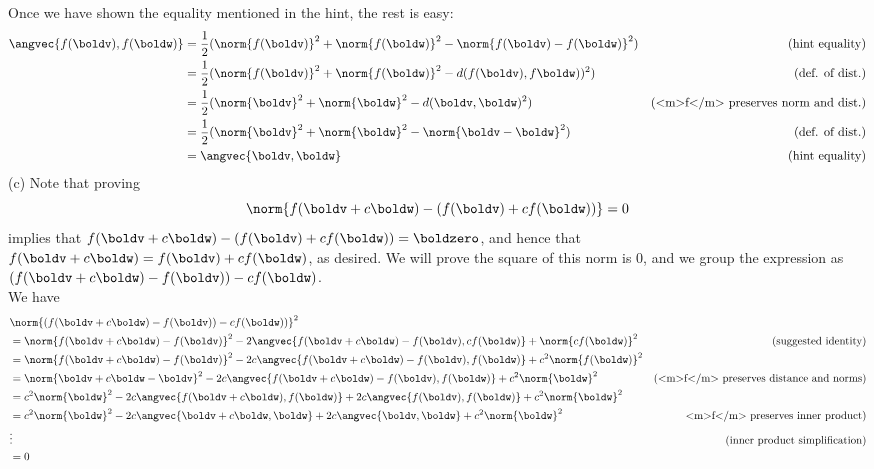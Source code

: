 \begin{solution}
Once we have shown the equality mentioned in the hint, the rest is easy:
\begin{align*}
\angvec{f(\boldv),f(\boldw)}&=\frac{1}{2}(\norm{f(\boldv)}^2+\norm{f(\boldw)}^2-\norm{f(\boldv)-f(\boldw)}^2) &\text{(hint equality)}\\
&=\frac{1}{2}(\norm{f(\boldv)}^2+\norm{f(\boldw)}^2-d(f(\boldv), f\boldw))^2) &\text{(def. of dist.)}\\
&=\frac{1}{2}(\norm{\boldv}^2+\norm{\boldw}^2-d(\boldv, \boldw)^2) &\text{(<m>f</m> preserves norm and dist.)}\\
&=\frac{1}{2}(\norm{\boldv}^2+\norm{\boldw}^2-\norm{\boldv-\boldw}^2) &\text{(def. of dist.)}\\
&=\angvec{\boldv,\boldw} &\text{(hint equality)}
\end{align*}
(c) Note that proving 
\[
\norm{f(\boldv+c\boldw)-(f(\boldv)+cf(\boldw))}=0
\]
implies that $f(\boldv+c\boldw)-(f(\boldv)+cf(\boldw))=\boldzero$, and hence that $f(\boldv+c\boldw)=f(\boldv)+cf(\boldw)$, as desired. We will prove the square of this norm is 0, and we group the expression as $(f(\boldv+c\boldw)-f(\boldv))-cf(\boldw)$. 
\\
We have
\begin{align*}
&\norm{\left(f(\boldv+c\boldw)-f(\boldv)\right)-cf(\boldw))}^2\\
&=\norm{f(\boldv+c\boldw)-f(\boldv)}^2-2\angvec{f(\boldv+c\boldw)-f(\boldv),cf(\boldw)}+\norm{cf(\boldw)}^2 &\text{(suggested identity)}\\
&=\norm{f(\boldv+c\boldw)-f(\boldv)}^2-2c\angvec{f(\boldv+c\boldw)-f(\boldv),f(\boldw)}+c^2\norm{f(\boldw)}^2 \\
&=\norm{\boldv+c\boldw- \boldv}^2-2c\angvec{f(\boldv+c\boldw)-f(\boldv),f(\boldw)}+c^2\norm{\boldw}^2 &\text{(<m>f</m> preserves distance and norms)}\\
&=c^2\norm{\boldw}^2-2c\angvec{f(\boldv+c\boldw),f(\boldw)}+2c\angvec{f(\boldv),f(\boldw)}+c^2\norm{\boldw}^2\\
&=c^2\norm{\boldw}^2-2c\angvec{\boldv+c\boldw,\boldw}+2c\angvec{\boldv, \boldw} +c^2\norm{\boldw}^2 &\text{<m>f</m> preserves inner product)}\\
&\vdots &\text{(inner product simplification)}\\
&=0
\end{align*}
\end{solution}
\ee
